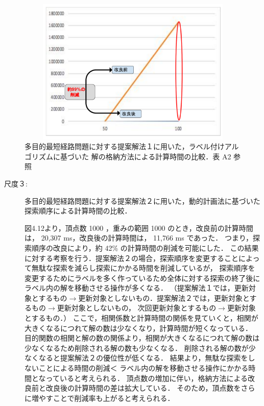 \documentclass[12pt]{optlab-bachelor}
\begin{document}
\begin{figure}[htbp]
  \centering
  \includegraphics[height=7.0cm , width=15.0cm]{fig/fig14.pdf}
  \caption{多目的最短経路問題に対する提案解法１に用いた，ラベル付けアルゴリズムに基づいた
  解の格納方法による計算時間の比較．表 A2 参照}
\end{figure}


\begin{description}
  \item[尺度３:]
  多目的最短経路問題に対する提案解法２に用いた，動的計画法に基づいた探索順序による計算時間の比較．

  図4.12より，頂点数 1000 ，重みの範囲 1000 のとき，改良前の計算時間は， 20,307 ms，改良後の計算時間は， 11,766 ms であった．
  つまり，探索順序の改良により，約 42\% の計算時間の削減を可能にした．
  この結果に対する考察を行う．提案解法２の場合，探索順序を変更することによって無駄な探索を減らし探索にかかる時間を削減しているが，
  探索順序を変更するためにラベルを多く作っているため全体に対する探索の終了後にラベル内の解を移動させる操作が多くなる．
  （提案解法１では，更新対象とするもの$\rightarrow$更新対象としないもの．提案解法２では，更新対象とするもの$\rightarrow$更新対象としないもの，
  次回更新対象とするもの$\rightarrow$更新対象とするもの．）
  ここで，相関係数と計算時間の関係を見ていくと，相関が大きくなるにつれて解の数は少なくなり，計算時間が短くなっている．
  目的関数の相関と解の数の関係より，相関が大きくなるにつれて解の数は少なくなるため削除される解の数も少なくなる．
  削除される解の数が少なくなると提案解法２の優位性が低くなる．
  結果より，無駄な探索をしないことによる時間の削減＜
  ラベル内の解を移動させる操作にかかる時間となっていると考えられる．
  頂点数の増加に伴い，格納方法による改良前と改良後の計算時間の差は拡大している．
  そのため，頂点数をさらに増やすことで削減率も上がると考えられる．

\end{description}
\end{document}
